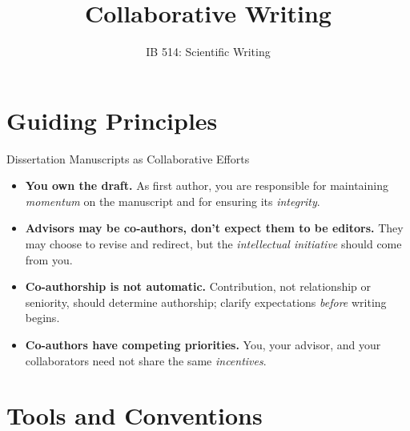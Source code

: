 \documentclass{beamer}
\title{Collaborative Writing}
\author[]{IB 514: Scientific Writing}
\date[]{}
\begin{document}
\begin{frame}
  \titlepage
\end{frame}
\section{Guiding Principles}

\begin{frame}{Dissertation Manuscripts as Collaborative Efforts}

  \footnotesize
  \begin{itemize}
    \item \textbf{You own the draft.} 
        As first author, you are responsible for maintaining \emph{momentum} on the manuscript and for ensuring its \emph{integrity}.
    \item \textbf{Advisors may be co-authors, don't expect them to be editors.}
        They may choose to revise and redirect, but the \emph{intellectual initiative} should come from you.
    \item \textbf{Co-authorship is not automatic.} Contribution, not
        relationship or seniority, should determine authorship; clarify
        expectations \emph{before} writing begins.
    \item \textbf{Co-authors have competing priorities.} 
        You, your advisor, and your collaborators need not share the same \emph{incentives}.
  \end{itemize}

\end{frame}




\section{Tools and Conventions}
\end{document}
